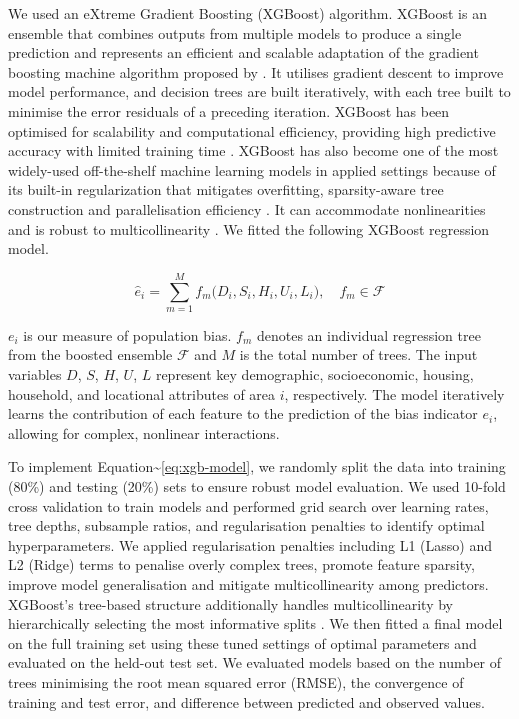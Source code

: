 \documentclass[]{rsos}%
\begin{document}
We used an eXtreme Gradient Boosting (XGBoost) algorithm. XGBoost is an
ensemble that combines outputs from multiple models to produce a single
prediction and represents an efficient and scalable adaptation of the
gradient boosting machine algorithm proposed by \citep{friedman2001a}. It
utilises gradient descent to improve model performance, and decision
trees are built iteratively, with each tree built to minimise the error
residuals of a preceding iteration. XGBoost has been optimised for
scalability and computational efficiency, providing high predictive
accuracy with limited training time \citep{chen2016, nielsen2016tree}.
XGBoost has also become one of the most widely-used off-the-shelf
machine learning models in applied settings because of its built-in
regularization that mitigates overfitting, sparsity-aware tree
construction and parallelisation efficiency \citep{chen2016}. It can
accommodate nonlinearities and is robust to multicollinearity
\citep{chen2016}. We fitted the following XGBoost regression model.

\begin{equation} \label{eq:xgb-model}
\widehat{e}_i 
= \sum_{m=1}^M f_m\bigl(D_i, S_i, H_i, U_i, L_i\bigr),
\quad f_m \in \mathcal{F}
\end{equation}

\(e_i\) is our measure of population bias. \(f_m\) denotes an individual
regression tree from the boosted ensemble \(\mathcal{F}\) and \(M\) is the
total number of trees. The input variables \(D\), \(S\), \(H\), \(U\), \(L\)
represent key demographic, socioeconomic, housing, household, and
locational attributes of area \(i\), respectively. The model iteratively
learns the contribution of each feature to the prediction of the bias
indicator \(e_i\), allowing for complex, nonlinear interactions.

To implement Equation\textasciitilde{}\ref{eq:xgb-model}, we randomly split the data
into training (80\%) and testing (20\%) sets to ensure robust model
evaluation. We used 10-fold cross validation to train models and
performed grid search over learning rates, tree depths, subsample
ratios, and regularisation penalties to identify optimal
hyperparameters. We applied regularisation penalties including L1
(Lasso) and L2 (Ridge) terms to penalise overly complex trees, promote
feature sparsity, improve model generalisation and mitigate
multicollinearity among predictors. XGBoost's tree-based structure
additionally handles multicollinearity by hierarchically selecting the
most informative splits \citep{chen2016}. We then fitted a final model on the
full training set using these tuned settings of optimal parameters and
evaluated on the held-out test set. We evaluated models based on the
number of trees minimising the root mean squared error (RMSE), the
convergence of training and test error, and difference between predicted
and observed values.
\end{document}

